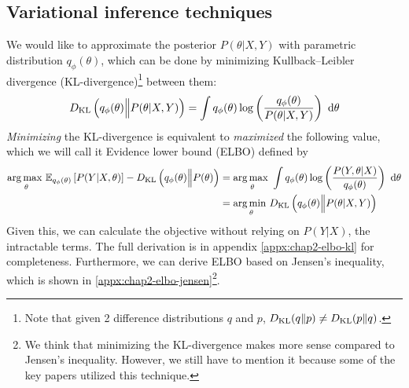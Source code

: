\subsection{Variational inference techniques}
\label{sec:chap2-vi-technique}
We would like to approximate the posterior $P(\theta | X, Y)$ with parametric distribution $q_{\phi} (\theta)$, which can be done by minimizing Kullback–Leibler divergence (KL-divergence)\footnote{Note that given 2 difference distributions $q$ and $p$, $D_{\mathrm{KL}}(q \| p) \ne D_{\mathrm{KL}}(p \| q)$.} between them:
\begin{equation}
    D_{\mathrm{KL}}\left( q_{\phi} (\theta) \Big\| P(\theta | X, Y) \right) = \int q_{\phi} (\theta) \log\left( \frac{q_{\phi} (\theta)}{P(\theta | X, Y)} \right) \ \mathrm{d} \theta
\end{equation}
\textit{Minimizing} the KL-divergence is equivalent to \textit{maximized} the following value, which we will call it Evidence lower bound (ELBO) defined by
\begin{equation}
\begin{aligned}
    \underset{\theta}{\arg\max \ } \mathbb{E}_{q_{\phi} (\theta)} \left[ P(Y | X, \theta) \right] - D_{\mathrm{KL}} \left(q_{\phi} (\theta) \Big\| P(\theta) \right) &= \underset{\theta}{\arg\max \ } \int q_{\phi}(\theta)\log\left(\frac{P(Y, \theta | X)}{q_{\phi}(\theta)}\right) \ \mathrm{d} \theta \\
    &= \underset{\theta }{\arg\min \ } D_{\mathrm{KL}}\left( q_{\phi} (\theta) \Big\| P(\theta | X, Y) \right)
\end{aligned}
\end{equation}
Given this, we can calculate the objective without relying on $P(Y | X)$, the intractable terms. The full derivation is in appendix \ref{appx:chap2-elbo-kl} for completeness. Furthermore, we can derive ELBO based on Jensen's inequality, which is shown in \ref{appx:chap2-elbo-jensen}\footnote{We think that minimizing the KL-divergence makes more sense compared to Jensen's inequality. However, we still have to mention it because some of the key papers utilized this technique.}. 

